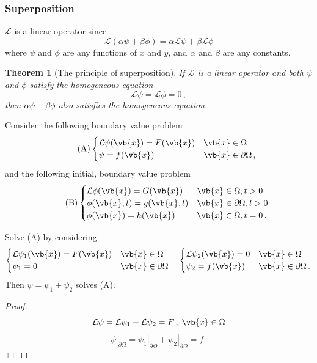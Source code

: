 \documentclass{article}
\theoremstyle{plain}\theoremheaderfont{\normalfont\itshape}\theorembodyfont{\rmfamily}\theoremseparator{.}\newtheorem*{rem}{Remark}\newtheorem*{ex}{Example}\newtheorem*{proof}{Proof}\newtheorem*{altp}{Alternative proof}
\theoremstyle{plain}\theoremheaderfont{\normalfont\bfseries}\theorembodyfont{\rmfamily}\theoremseparator{.}\newtheorem{thm}{Theorem}[section]\newtheorem{lem}[thm]{Lemma}\newtheorem{prop}[thm]{Proposition}\newtheorem*{cor}{Corollary}\newtheorem{defn}[thm]{Definition}\newtheorem{clm}[thm]{Claim}\newtheorem{clminproof}{Claim}
\theoremstyle{break}\theoremheaderfont{\normalfont\itshape}\theorembodyfont{\rmfamily}\theoremseparator{.\medskip}\newtheorem*{proofskip}{Proof}\newtheorem*{exs}{Examples}\newtheorem*{rems}{Remarks}
\theoremstyle{break}\theoremheaderfont{\normalfont\bfseries}\theorembodyfont{\rmfamily}\theoremseparator{.\medskip}\newtheorem{lemskip}[thm]{Lemma}\newtheorem{defnskip}[thm]{Definition}\newtheorem{propskip}[thm]{Proposition}\newtheorem{thmskip}[thm]{Theorem}
\numberwithin{equation}{section}
\newcommand{\qed}{\hfill\ensuremath{\Box}}
\begin{document}
	\subsubsection{Superposition}
	\(\mathcal{L}\) is a linear operator since
	\[\mathcal{L}(\alpha\psi+\beta\phi)=\alpha \mathcal{L}\psi+\beta \mathcal{L}\phi\]
	where \(\psi\) and \(\phi\) are any functions of \(x\) and \(y\), and \(\alpha\) and \(\beta\) are any constants.
	
	\begin{thm}[The principle of superposition]		
		If \(\mathcal{L}\) is a linear operator and both \(\psi\) and \(\phi\) satisfy the homogeneous equation
		\[\mathcal{L}\psi=\mathcal{L}\phi=0\,,\]
		then \(\alpha\psi+\beta\phi\) also satisfies the homogeneous equation.
	\end{thm}
	
	Consider the following boundary value problem
	\begin{equation}\tag{A}
		\begin{cases}
			\mathcal{L}\psi(\vb{x})=F(\vb{x}) & \vb{x}\in\Omega\\
			\psi=f(\vb{x}) & \vb{x}\in\partial\Omega\,,
		\end{cases}
	\end{equation}
	and the following initial, boundary value problem
	\begin{equation}\tag{B}
		\begin{cases}
			\mathcal{L}\phi(\vb{x})=G(\vb{x}) & \vb{x}\in\Omega,t>0\\
			\phi(\vb{x},t)=g(\vb{x},t) & \vb{x}\in\partial\Omega,t>0\\
			\phi(\vb{x})=h(\vb{x}) & \vb{x}\in\Omega,t=0\,.
		\end{cases}
	\end{equation}

	Solve (A) by considering
	\[\begin{cases}
		\mathcal{L}\psi_1(\vb{x})=F(\vb{x}) & \vb{x}\in\Omega\\
		\psi_1=0 & \vb{x}\in\partial\Omega
	\end{cases}\quad\begin{cases}
		\mathcal{L}\psi_2(\vb{x})=0 & \vb{x}\in\Omega\\
		\psi_2=f(\vb{x}) & \vb{x}\in\partial\Omega\,.
	\end{cases}\]
	Then \(\psi=\psi_1+\psi_2\) solves (A).
	\begin{proof}
		\[\mathcal{L}\psi=\mathcal{L}\psi_1+\mathcal{L}\psi_2=F\,,\;\vb{x}\in\Omega\]
		\[\left.\psi\right|_{\partial\Omega}=\left.\psi_1\right|_{\partial\Omega}+\left.\psi_2\right|_{\partial\Omega}=f\,.\]\qed
	\end{proof}
\end{document}
